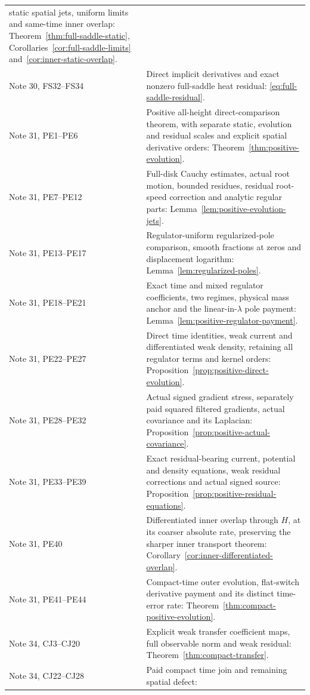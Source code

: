 \begin{longtable}{@{}>{\raggedright\arraybackslash}p{}>{\raggedright\arraybackslash}p{}@{}}
static spatial jets, uniform limits and same-time inner overlap:
Theorem~\ref{thm:full-saddle-static}, Corollaries~\ref{cor:full-saddle-limits}
and~\ref{cor:inner-static-overlap}.\\
Note 30, FS32--FS34 & Direct implicit derivatives and exact nonzero
full-saddle heat residual: \eqref{eq:full-saddle-residual}.\\
Note 31, PE1--PE6 & Positive all-height direct-comparison theorem,
with separate static, evolution and residual scales and explicit
spatial derivative orders: Theorem~\ref{thm:positive-evolution}.\\
Note 31, PE7--PE12 & Full-disk Cauchy estimates, actual root motion,
bounded residues, residual root-speed correction and analytic regular
parts: Lemma~\ref{lem:positive-evolution-jets}.\\
Note 31, PE13--PE17 & Regulator-uniform regularized-pole comparison,
smooth fractions at zeros and displacement logarithm:
Lemma~\ref{lem:regularized-poles}.\\
Note 31, PE18--PE21 & Exact time and mixed regulator coefficients,
two regimes, physical mass anchor and the linear-in-$\lambda$ pole
payment: Lemma~\ref{lem:positive-regulator-payment}.\\
Note 31, PE22--PE27 & Direct time identities, weak current and
differentiated weak density, retaining all regulator terms and kernel
orders: Proposition~\ref{prop:positive-direct-evolution}.\\
Note 31, PE28--PE32 & Actual signed gradient stress, separately paid
squared filtered gradients, actual covariance and its Laplacian:
Proposition~\ref{prop:positive-actual-covariance}.\\
Note 31, PE33--PE39 & Exact residual-bearing current, potential and
density equations, weak residual corrections and actual signed source:
Proposition~\ref{prop:positive-residual-equations}.\\
Note 31, PE40 & Differentiated inner overlap through $H$, at its coarser
absolute rate, preserving the sharper inner transport theorem:
Corollary~\ref{cor:inner-differentiated-overlap}.\\
Note 31, PE41--PE44 & Compact-time outer evolution, flat-switch
derivative payment and its distinct time-error rate:
Theorem~\ref{thm:compact-positive-evolution}.\\
Note 34, CJ3--CJ20 & Explicit weak transfer coefficient maps, full observable
norm and weak residual: Theorem~\ref{thm:compact-transfer}.\\
Note 34, CJ22--CJ28 & Paid compact time join and remaining spatial defect:

\end{longtable}
